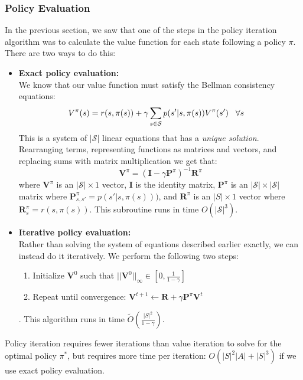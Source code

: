 \subsubsection{Policy Evaluation}
In the previous section, we saw that one of the steps in the policy iteration algorithm was to calculate the value function for each state following a policy $\pi$. There are two ways to do this:
\begin{itemize}
    \item \textbf{Exact policy evaluation:}\\
    We know that our value function must satisfy the Bellman consistency equations:
    \begin{align*}
        V^{\pi}(s) &= r(s, \pi(s)) + \gamma \sum_{s \in \mathcal{S}}p(s'|s, \pi(s))V^{\pi}(s') \hspace{3mm} \forall s
    \end{align*}
    This is a system of $|\mathcal{S}|$ linear equations that has a \textit{unique solution}. Rearranging terms, representing functions as matrices and vectors, and replacing sums with matrix multiplication we get that: $$\textbf{V}^{\pi} = (\textbf{I} - \gamma \textbf{P}^\pi)^{-1}\textbf{R}^{\pi}$$ where $\textbf{V}^\pi$ is an $|\mathcal{S}| \times 1$ vector, $\textbf{I}$ is the identity matrix, $\textbf{P}^\pi$ is an $|\mathcal{S}| \times |\mathcal{S}|$ matrix where $\textbf{P}^\pi_{s, s'} = p(s'|s, \pi(s)))$, and $\textbf{R}^\pi$ is an $|S| \times 1$ vector where $\textbf{R}^\pi_s = r(s, \pi(s))$. This subroutine runs in time $O(|\mathcal{S}|^3)$.
    \item \textbf{Iterative policy evaluation:}\\
    Rather than solving the system of equations described earlier exactly, we can instead do it iteratively. We perform the following two steps:
    \begin{enumerate}
        \item Initialize $\textbf{V}^{0}$ such that $||\textbf{V}^0||_\infty \in \left[0, \frac{1}{1 - \gamma}\right]$
        \item Repeat until convergence: $\textbf{V}^{t + 1} \leftarrow \textbf{R} + \gamma \textbf{P}^{\pi}\textbf{V}^t$
    \end{enumerate}. This algorithm runs in time $\tilde{O}\left(\frac{|S|^2}{1 - \gamma}\right)$.
\end{itemize}
Policy iteration requires fewer iterations than value iteration to solve for the optimal policy $\pi^*$, but requires more time per iteration: $O(|S|^2|A| + |S|^3)$ if we use exact policy evaluation.